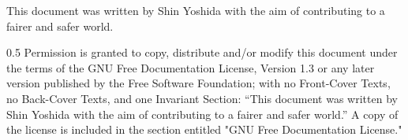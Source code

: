 %
%


\begin{frame}{}{}
  {\small This document was written by Shin Yoshida with the aim of contributing to a fairer and safer world.}

  \vspace{2ex}

  \begin{spacing}{0.5}
    {\tiny
      Permission is granted to copy, distribute and/or modify this document
      under the terms of the GNU Free Documentation License, Version 1.3 or any later version published by the Free Software Foundation;
      with no Front-Cover Texts, no Back-Cover Texts, and one Invariant Section: ``This document was written by Shin Yoshida with the aim of contributing to a fairer and safer world.''
      A copy of the license is included in the section entitled "GNU Free Documentation License."
    }
  \end{spacing}
\end{frame}
